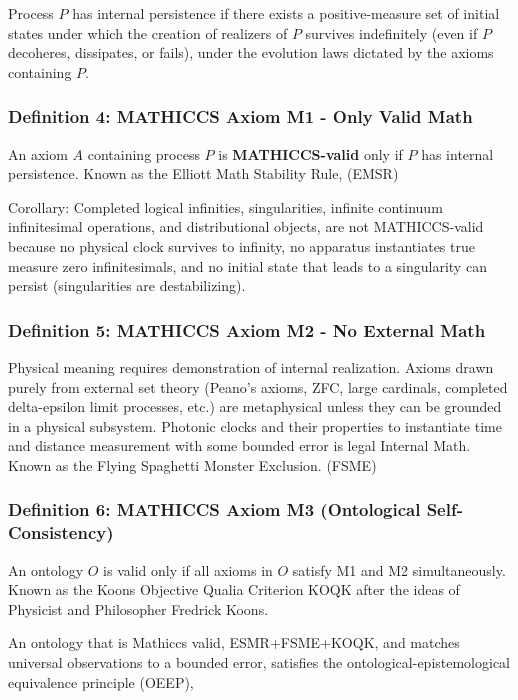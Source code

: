 \documentclass[11pt,a4paper]{article}
\begin{document}
  Process $P$ has internal persistence if there exists a positive-measure set of initial states under which the creation of realizers of $P$ survives indefinitely (even if $P$ decoheres, dissipates, or fails), under the evolution laws dictated by the axioms containing $P$.

  \subsubsection{Definition 4: MATHICCS Axiom M1 - Only Valid Math}

  An axiom $A$ containing process $P$ is \textbf{MATHICCS-valid} only if $P$ has internal persistence. Known as the Elliott Math Stability Rule, (EMSR)

  Corollary: Completed logical infinities, singularities, infinite continuum infinitesimal operations, and distributional objects, are not MATHICCS-valid because no physical clock survives to infinity, no apparatus instantiates true measure zero infinitesimals, and no initial state that leads to a singularity can persist (singularities are destabilizing).

  \subsubsection{Definition 5: MATHICCS Axiom M2 - No External Math}

  Physical meaning requires demonstration of internal realization. Axioms drawn purely from external set theory (Peano's axioms, ZFC, large cardinals, completed delta-epsilon limit processes, etc.) are metaphysical unless they can be grounded in a physical subsystem. Photonic clocks and their properties to instantiate time and distance measurement with some bounded error is legal Internal Math. Known as the Flying Spaghetti Monster Exclusion. (FSME)

  \subsubsection{Definition 6: MATHICCS Axiom M3 (Ontological Self-Consistency)}

  An ontology $O$ is valid only if all axioms in $O$ satisfy M1 and M2 simultaneously. Known as the Koons Objective Qualia Criterion KOQK after the ideas of Physicist and Philosopher Fredrick Koons. 

  An ontology that is Mathiccs valid, ESMR+FSME+KOQK, and matches universal  observations to a bounded error, satisfies the ontological-epistemological equivalence principle (OEEP),  
\end{document}
